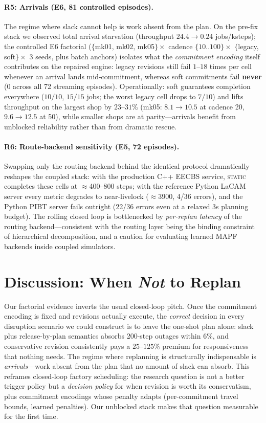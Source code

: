 \documentclass[twocolumn]{article}
\begin{document}
\paragraph{R5: Arrivals (E6, 81 controlled episodes).}
The regime where slack cannot help is work absent from the plan. On the
pre-fix stack we observed total arrival starvation (throughput
$24.4\to0.24$ jobs/ksteps); the controlled E6 factorial
($\{$mk01, mk02, mk05$\}\times$ cadence $\{10..100\}\times$
$\{$legacy, soft$\}\times$ 3 seeds, plus batch anchors) isolates what
the \emph{commitment encoding} itself contributes on the repaired
engine: legacy revisions still fail $1$--$18$ times per cell whenever
an arrival lands mid-commitment, whereas soft commitments fail
\textbf{never} ($0$ across all 72 streaming episodes). Operationally:
soft guarantees completion everywhere ($10/10$, $15/15$ jobs; the worst
legacy cell drops to $7/10$) and lifts throughput on the largest shop
by $23$--$31\%$ (mk05: $8.1\to10.5$ at cadence 20, $9.6\to12.5$ at 50),
while smaller shops are at parity---arrivals benefit from unblocked
reliability rather than from dramatic rescue.

\paragraph{R6: Route-backend sensitivity (E5, 72 episodes).}
Swapping only the routing backend behind the identical protocol
dramatically reshapes the coupled stack: with the production C++
EECBS service, \textsc{static} completes these cells at
$\approx$400--800 steps; with the reference Python LaCAM server every
metric degrades to near-livelock ($\approx$3900, 4/36 errors), and the
Python PIBT server fails outright (22/36 errors even at a relaxed 3s
planning budget). The rolling closed loop is bottlenecked by
\emph{per-replan latency} of the routing backend---consistent with the
routing layer being the binding constraint of hierarchical
decomposition, and a caution for evaluating learned MAPF backends
inside coupled simulators.

\section{Discussion: When \emph{Not} to Replan}
Our factorial evidence inverts the usual closed-loop pitch. Once the
commitment encoding is fixed and revisions actually execute, the
\emph{correct} decision in every disruption scenario we could construct
is to leave the one-shot plan alone: slack plus release-by-plan
semantics absorbs 200-step outages within 6\%, and conservative
revision consistently pays a $25$--$125\%$ premium for responsiveness
that nothing needs. The regime where replanning is structurally
indispensable is \emph{arrivals}---work absent from the plan that no
amount of slack can absorb. This reframes closed-loop factory
scheduling: the research question is not a better trigger policy but a
\emph{decision policy} for when revision is worth its conservatism,
plus commitment encodings whose penalty adapts (per-commitment travel
bounds, learned penalties). Our unblocked stack makes that question
measurable for the first time.
\end{document}
